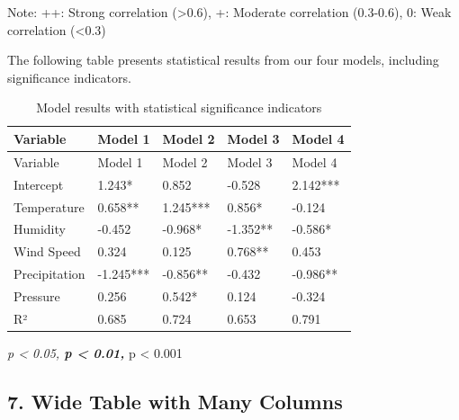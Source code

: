 \documentclass[
  letterpaper,
  oneside,
  openany]{MastersDoctoralThesis}
\theoremstyle{plain}
\theoremstyle{remark}
\begin{document}
Note: ++: Strong correlation (\textgreater0.6), +: Moderate correlation
(0.3-0.6), 0: Weak correlation (\textless0.3)

The following table presents statistical results from our four models,
including significance indicators.

\begin{longtable}[]{@{}lllll@{}}
\caption{Model results with statistical significance
indicators}\label{tbl-app-b-significance}\tabularnewline
\toprule\noalign{}
Variable & Model 1 & Model 2 & Model 3 & Model 4 \\
\midrule\noalign{}
\endfirsthead
\toprule\noalign{}
Variable & Model 1 & Model 2 & Model 3 & Model 4 \\
\midrule\noalign{}
\endhead
\bottomrule\noalign{}
\endlastfoot
Intercept & 1.243* & 0.852 & -0.528 & 2.142*** \\
Temperature & 0.658** & 1.245*** & 0.856* & -0.124 \\
Humidity & -0.452 & -0.968* & -1.352** & -0.586* \\
Wind Speed & 0.324 & 0.125 & 0.768** & 0.453 \\
Precipitation & -1.245*** & -0.856** & -0.432 & -0.986** \\
Pressure & 0.256 & 0.542* & 0.124 & -0.324 \\
R² & 0.685 & 0.724 & 0.653 & 0.791 \\
\end{longtable}

\emph{p \textless{} 0.05, \textbf{p \textless{} 0.01, }}p \textless{}
0.001

\subsection{7. Wide Table with Many Columns}\label{sec-app-b-wide-table}
\end{document}
